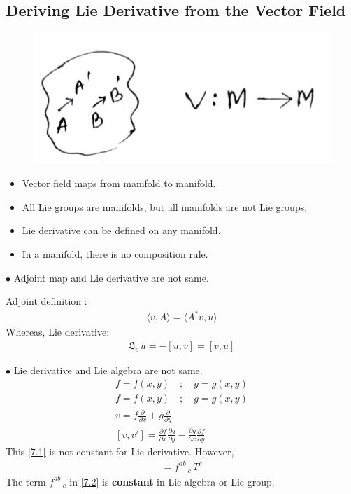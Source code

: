 \documentclass[14pt]{article} %
\begin{document}
\subsection*{Deriving Lie Derivative from the Vector Field}
\vspace{-0.7cm}
\begin{figure}[H]
\centering
\includegraphics[width=0.4\linewidth]{L4.jpeg}
\caption*{}
\end{figure}
\vspace{-1cm}
\begin{itemize}
\item Vector field maps from manifold to manifold.
\item All Lie groups are manifolds, but all manifolds are not Lie groups.
\item Lie derivative can be defined on any manifold.
\item In a manifold, there is no composition rule.
\end{itemize}
\begin{tcolorbox}[ title=Previous class discussion]
$\bullet$ Adjoint map and Lie derivative are not same.

Adjoint definition :
\begin{align*}
\langle v,A \rangle = \langle A^*v , u \rangle
\end{align*}
Whereas, Lie derivative:
\begin{align*} \mathfrak{L}_v \, u = -[u,v] = [v,u] \end{align*}

$\bullet$ Lie derivative and Lie algebra are not same.
\begin{align*}
f=f(x,y) \quad; \quad g=g(x,y)
\end{align*}
\begin{align*}
f=f(x,y) \quad; \quad g=g(x,y) \\
v = f \frac{\partial}{\partial x} + g \frac{\partial}{\partial y} \\
[v,v'] = \frac{\partial f}{\partial x}\frac{\partial g}{\partial y} - \frac{\partial g}{\partial x} \frac{\partial f}{\partial y} \tag{7.1} \label{7.1}
\end{align*}
This \eqref{7.1} is not constant for Lie derivative. However,
\begin{align*}
[T^a , T^b] = f^{ab}\,_c \,T^c \tag{7.2} \label{7.2}
\end{align*}
The term $f^{ab}\,_c$ in \eqref{7.2} is \textbf{constant} in Lie algebra or Lie group.
\end{tcolorbox}
\end{document}
